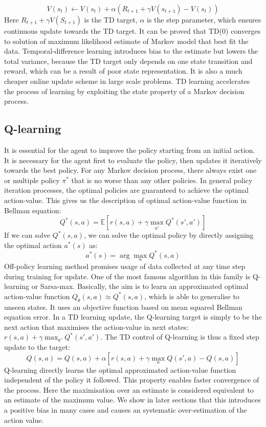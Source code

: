 \documentclass[oneside,11pt,a4paper]{article}
\begin{document}
$$
V(s_t)\leftarrow V(s_t)+\alpha(R_{t+1}+\gamma V(s_{t+1})-V(s_t))
$$
Here $R_{t+1}+\gamma V(S_{t+1})$ is the TD target, $\alpha$ is the step parameter, which ensures continuous update towards the TD target. It can be proved that TD(0) converges to solution of maximum likelihood estimate of Markov model that best fit the data. Temporal-difference learning introduces bias to the estimate but lowers the total variance, because the TD target only depends on one state transition and reward, which can be a result of poor state representation. It is also a much cheaper online update scheme in large scale problems. TD learning accelerates the process of learning by exploiting the state property of a Markov decision process.
\newline
\newline
\noindent
\subsection{Q-learning}
It is essential for the agent to improve the policy starting from an initial action. It is necessary for the agent first to evaluate the policy, then updates it iteratively towards the best policy. For any Markov decision process, there always exist one or multiple policy $\pi^*$ that is no worse than any other policies. In general policy iteration processes, the optimal policies are guaranteed to achieve the optimal action-value. This gives us the description of optimal action-value function in Bellman equation:
$$
Q^*(s,a) = \mathbb E[r(s,a) + \gamma\max_{a'} Q^*(s',a')]
$$
If we can solve $Q^*(s,a)$, we can solve the optimal policy by directly assigning the optimal action $a^*(s)$ as:
$$
a^*(s) = \arg\max_aQ^*(s,a)
$$
Off-policy learning method promises usage of data collected at any time step during training for update. One of the most famous algorithm in this family is Q-learning or Sarsa-max. Basically, the aim is to learn an approximated optimal action-value function $Q_\theta(s,a)\approx Q^*(s,a)$, which is able to generalise to unseen states. It uses an objective function based on mean squared Bellman equation error. In a TD learning update, the Q-learning target is simply to be the next action that maximises the action-value in next states: $r(s,a) + \gamma\max_{a'} Q^*(s',a')$. The TD control of Q-learning is thus a fixed step update to the target:
$$
Q(s,a) = Q(s,a) +\alpha[r(s,a)+\gamma\max_a Q(s',a) - Q(s,a)]
$$
Q-learning directly learns the optimal approximated action-value function independent of the policy it followed. This property enables faster convergence of the process. Here the maximisation over an estimate is considered equivalent to an estimate of the maximum value. We show in later sections that this introduces a positive bias in many cases and causes an systematic over-estimation of the action value.
\newline
\newline
\noindent
\end{document}
